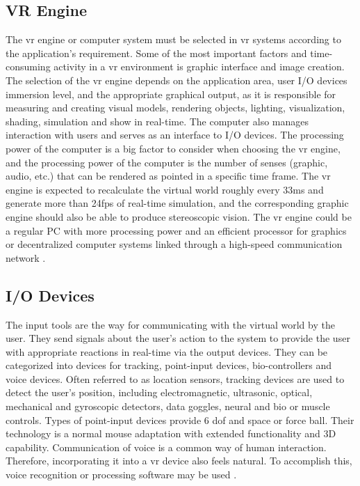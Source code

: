\subsection{VR Engine}
 The \acrshort{vr} engine or computer system must be selected in \acrshort{vr} systems according to the application's requirement. Some of the most important factors and time-consuming activity in a \acrshort{vr} environment is graphic interface and image creation. The selection of the \acrshort{vr} engine depends on the application area, user I/O devices immersion level, and the appropriate graphical output, as it is responsible for measuring and creating visual models, rendering objects, lighting, visualization, shading, simulation and show in real-time. The computer also manages interaction with users and serves as an interface to I/O devices. The processing power of the computer is a big factor to consider when choosing the \acrshort{vr} engine, and the processing power of the computer is the number of senses (graphic, audio, etc.) that can be rendered as pointed in a specific time frame. The \acrshort{vr} engine is expected to recalculate the virtual world roughly every 33ms and generate more than 24fps of real-time simulation, and the corresponding graphic engine should also be able to produce stereoscopic vision. The \acrshort{vr} engine could be a regular PC with more processing power and an efficient processor for graphics or decentralized computer systems linked through a high-speed communication network \citep{burdea2017virtual, Bamodu2013VirtualComponents}.


\subsection{I/O Devices}
 The input tools are the way for communicating with the virtual world by the user. They send signals about the user's action to the system to provide the user with appropriate reactions in real-time via the output devices. They can be categorized into devices for tracking, point-input devices, bio-controllers and voice devices. Often referred to as location sensors, tracking devices are used to detect the user's position, including electromagnetic, ultrasonic, optical, mechanical and gyroscopic detectors, data goggles, neural and bio or muscle controls. Types of point-input devices provide 6 \acrfull{dof} and space or force ball. Their technology is a normal mouse adaptation with extended functionality and 3D capability. Communication of voice is a common way of human interaction. Therefore, incorporating it into a \acrshort{vr} device also feels natural. To accomplish this, voice recognition or processing software may be used \citep{burdea2017virtual, Bamodu2013VirtualComponents} .

